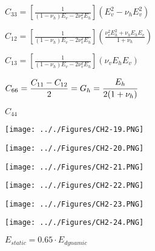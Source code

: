\documentclass[onecolumn,11pt]{report}
\def\lthtmlcheckvsize{\ifdim\ht\sizebox<\vsize 
  \ifdim\wd\sizebox<\hsize\expandafter\hfill\fi \expandafter\vfill
  \else\expandafter\vss\fi}%
\begin{document}
{\newpage\clearpage
{}%
$\displaystyle C_{33} =  \left[ \frac{1}{(1-\nu_h) E_v - 2 \nu_v^2 E_h}  \right] (E_v^2 - \nu_h E_v^2) $%
\lthtmlindisplaymathZ
\lthtmlcheckvsize\clearpage}

{\newpage\clearpage
{}%
$\displaystyle C_{12} =  \left[ \frac{1}{(1-\nu_h) E_v - 2 \nu_v^2 E_h}  \right] \left( \frac{\nu_v^2 E_h^2 + \nu_h E_h E_v}{1+\nu_h} \right) $%
\lthtmlindisplaymathZ
\lthtmlcheckvsize\clearpage}

{\newpage\clearpage
{}%
$\displaystyle C_{13} =  \left[ \frac{1}{(1-\nu_h) E_v - 2 \nu_v^2 E_h}  \right] (\nu_v E_h E_v) $%
\lthtmlindisplaymathZ
\lthtmlcheckvsize\clearpage}

{\newpage\clearpage
{}%
$\displaystyle C_{66} = \frac{C_{11}-C_{12}}{2} = G_h = \cfrac{E_h}{2(1+\nu_h)} $%
\lthtmlindisplaymathZ
\lthtmlcheckvsize\clearpage}

{\newpage\clearpage
{}%
$ C_{44}$%
\lthtmlindisplaymathZ
\lthtmlcheckvsize\clearpage}

{\newpage\clearpage
{}%
\texttt{[image: .././Figures/CH2-19.PNG]}%
\lthtmlpictureZ
\lthtmlcheckvsize\clearpage}

{\newpage\clearpage
{}%
\texttt{[image: .././Figures/CH2-20.PNG]}%
\lthtmlpictureZ
\lthtmlcheckvsize\clearpage}

{\newpage\clearpage
{}%
\texttt{[image: .././Figures/CH2-21.PNG]}%
\lthtmlpictureZ
\lthtmlcheckvsize\clearpage}

{\newpage\clearpage
{}%
\texttt{[image: .././Figures/CH2-22.PNG]}%
\lthtmlpictureZ
\lthtmlcheckvsize\clearpage}

{\newpage\clearpage
{}%
\texttt{[image: .././Figures/CH2-23.PNG]}%
\lthtmlpictureZ
\lthtmlcheckvsize\clearpage}

{\newpage\clearpage
{}%
\texttt{[image: .././Figures/CH2-24.PNG]}%
\lthtmlpictureZ
\lthtmlcheckvsize\clearpage}

{\newpage\clearpage
{}%
$ E_{static} = 0.65 \cdot E_{dynamic}$%
\lthtmlindisplaymathZ
\lthtmlcheckvsize\clearpage}
\end{document}
